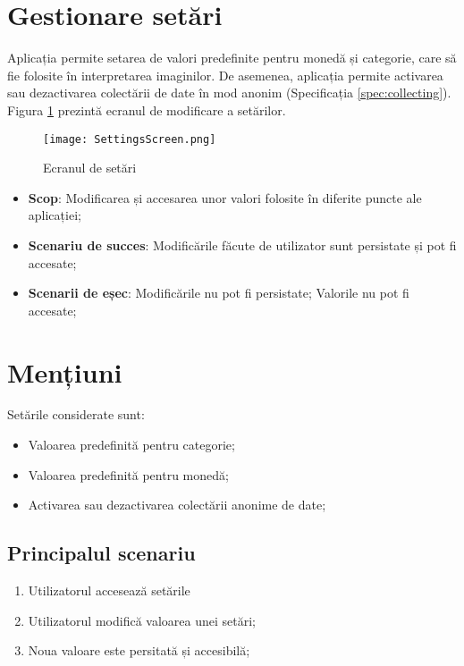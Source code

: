 \section{Gestionare setări}\label{spec:setari}

Aplicația permite setarea de valori predefinite pentru monedă și categorie, care să fie folosite în interpretarea imaginilor. De asemenea, aplicația permite activarea sau dezactivarea colectării de date în mod anonim (Specificația \ref{spec:collecting}). Figura \ref{fig:settingsScreen} prezintă ecranul de modificare a setărilor. 

\begin{figure}[h]
  \centering
  \texttt{[image: SettingsScreen.png]}
  \caption{Ecranul de setări}
  \label{fig:settingsScreen}
\end{figure}

\begin{itemize}
\item
  \textbf{Scop}: Modificarea și accesarea unor valori folosite în diferite puncte ale aplicației;
\item
  \textbf{Scenariu de succes}: Modificările făcute de utilizator sunt persistate și pot fi accesate;
\item
  \textbf{Scenarii de eșec}: Modificările nu pot fi persistate; Valorile nu pot fi accesate;
\end{itemize}

\begin{minipage}[t]{0.49\textwidth}

\section*{Mențiuni}
Setările considerate sunt:
\begin{itemize}
  \item
    Valoarea predefinită pentru categorie;
  \item
    Valoarea predefinită pentru monedă;
  \item
    Activarea sau dezactivarea colectării anonime de date;
\end{itemize}    

\end{minipage} \hspace{0.03\textwidth}
\begin{minipage}[t]{0.48\textwidth}
  
\subsection*{Principalul scenariu}
\begin{enumerate}
\item
  Utilizatorul accesează setările
\item
  Utilizatorul modifică valoarea unei setări;
\item
  Noua valoare este persitată și accesibilă;
\end{enumerate}  

\end{minipage}



